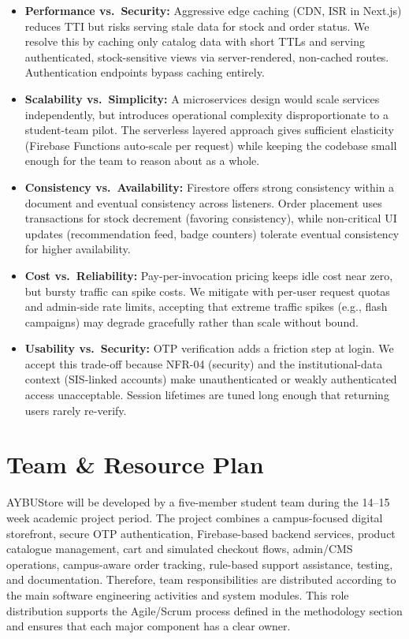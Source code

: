 \documentclass[11pt,a4paper]{article}
\begin{document}
\begin{itemize}
    \item \textbf{Performance vs.\ Security:} Aggressive edge caching (CDN, ISR in Next.js) reduces TTI but risks serving stale data for stock and order status. We resolve this by caching only catalog data with short TTLs and serving authenticated, stock-sensitive views via server-rendered, non-cached routes. Authentication endpoints bypass caching entirely.
    \item \textbf{Scalability vs.\ Simplicity:} A microservices design would scale services independently, but introduces operational complexity disproportionate to a student-team pilot. The serverless layered approach gives sufficient elasticity (Firebase Functions auto-scale per request) while keeping the codebase small enough for the team to reason about as a whole.
    \item \textbf{Consistency vs.\ Availability:} Firestore offers strong consistency within a document and eventual consistency across listeners. Order placement uses transactions for stock decrement (favoring consistency), while non-critical UI updates (recommendation feed, badge counters) tolerate eventual consistency for higher availability.
    \item \textbf{Cost vs.\ Reliability:} Pay-per-invocation pricing keeps idle cost near zero, but bursty traffic can spike costs. We mitigate with per-user request quotas and admin-side rate limits, accepting that extreme traffic spikes (e.g., flash campaigns) may degrade gracefully rather than scale without bound.
    \item \textbf{Usability vs.\ Security:} OTP verification adds a friction step at login. We accept this trade-off because NFR-04 (security) and the institutional-data context (SIS-linked accounts) make unauthenticated or weakly authenticated access unacceptable. Session lifetimes are tuned long enough that returning users rarely re-verify.
\end{itemize}
 
\newpage
 
 
\section{Team \& Resource Plan}
\label{sec:team-resource-plan}
 
AYBUStore will be developed by a five-member student team during the
14--15 week academic project period. The project combines a campus-focused
digital storefront, secure OTP authentication, Firebase-based backend
services, product catalogue management, cart and simulated checkout flows,
admin/CMS operations, campus-aware order tracking, rule-based support
assistance, testing, and documentation. Therefore, team responsibilities
are distributed according to the main software engineering activities and
system modules. This role distribution supports the Agile/Scrum process
defined in the methodology section and ensures that each major component
has a clear owner.
 
\end{document}
